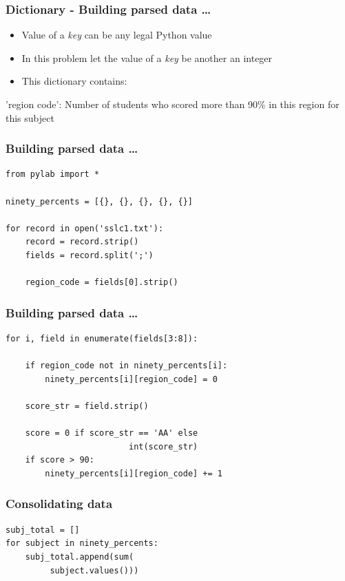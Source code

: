 \documentclass[14pt,compress]{beamer}
\begin{document}
\begin{frame}[fragile]
  \frametitle{Dictionary - Building parsed data \ldots}
  \begin{itemize}
    \item Value of a \emph{key} can be any legal Python value
    \item In this problem let the value of a \emph{key} be another an integer
    \item This dictionary contains:
  \end{itemize}
'region code': Number of students who scored more than 90\% in this region for this subject
\end{frame}

\begin{frame}[fragile]
  \frametitle{Building parsed data \ldots}
  \begin{lstlisting}
from pylab import *

ninety_percents = [{}, {}, {}, {}, {}]

for record in open('sslc1.txt'):
    record = record.strip()
    fields = record.split(';')

    region_code = fields[0].strip()
  \end{lstlisting}
\end{frame}

\begin{frame}[fragile]
  \frametitle{Building parsed data \ldots}
  \small
  \begin{lstlisting}
for i, field in enumerate(fields[3:8]):

    if region_code not in ninety_percents[i]:
        ninety_percents[i][region_code] = 0

    score_str = field.strip()

    score = 0 if score_str == 'AA' else 
                         int(score_str)
    if score > 90:
        ninety_percents[i][region_code] += 1
  \end{lstlisting}
\end{frame}

\begin{frame}[fragile]
  \frametitle{Consolidating data}
  \begin{lstlisting}
subj_total = []
for subject in ninety_percents:
    subj_total.append(sum(
         subject.values()))
  \end{lstlisting}
\end{frame}
\end{document}
